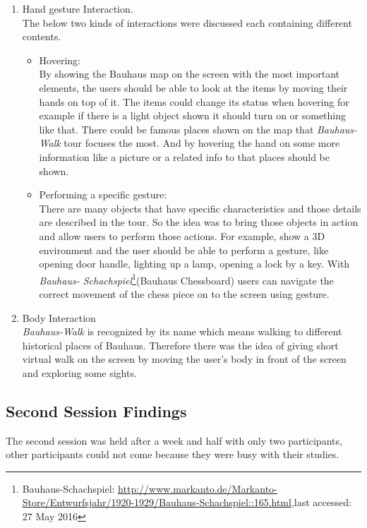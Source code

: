 \begin {enumerate}
\item   Hand gesture Interaction. \\
The below two kinds of interactions were discussed each containing different contents. 

\begin {itemize}
\item   Hovering: \\
By showing the Bauhaus map on the screen with the most important elements, the users should be able to look at the items by moving their hands on top of it. The items could change its status when hovering for example if there is a light object shown it should turn on or something like that.
There could be famous places shown on the map that \emph{Bauhaus-Walk} tour focuses the most. And by hovering the hand on some more information like a picture or a related info to that places should be shown.

\item   Performing a specific gesture:\\
There are many objects that have specific characteristics and those details are described in the tour. So the idea was to bring those objects in action and allow users to perform those actions. For example, show a 3D environment and the user should be able to perform a gesture, like opening door handle, lighting up a lamp, opening a lock by a key. With \emph{Bauhaus- Schachspiel}\footnote{Bauhaus-Schachspiel: \url{http://www.markanto.de/Markanto-Store/Entwurfsjahr/1920-1929/Bauhaus-Schachspiel::165.html},last accessed: 27 May 2016 }(Bauhaus Chessboard) users can navigate the correct movement of the chess piece on to the screen using gesture.
\end{itemize}


\item	Body Interaction  \\
\emph{Bauhaus-Walk} is recognized by its name which means walking to different historical places of Bauhaus. Therefore there was the idea of giving short virtual walk on the screen by moving the user's body in front of the screen and exploring some sights.

\end{enumerate}


\subsection{Second Session Findings}
The second session was held after a week and half with only two participants, other participants could not come because they were busy with their studies. 

